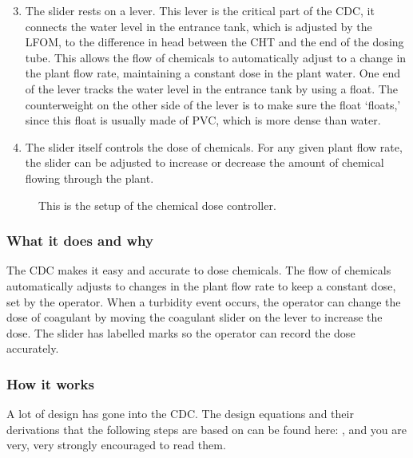 \documentclass[letterpaper,10pt,english]{sphinxmanual}
\let\sphinxpxdimen\pdfpxdimen\else\newdimen\sphinxpxdimen
\begin{document}
\begin{enumerate}
\setcounter{enumi}{2}
\item {} 
The slider rests on a lever. This lever is the critical part of the CDC, it connects the water level in the entrance tank, which is adjusted by the LFOM, to the difference in head between the CHT and the end of the dosing tube. This allows the flow of chemicals to automatically adjust to a change in the plant flow rate, maintaining a constant dose in the plant water. One end of the lever tracks the water level in the entrance tank by using a float. The counterweight on the other side of the lever is to make sure the float ‘floats,’ since this float is usually made of PVC, which is more dense than water.

\item {} 
The slider itself controls the dose of chemicals. For any given plant flow rate, the slider can be adjusted to increase or decrease the amount of chemical flowing through the plant.

\end{enumerate}

\begin{figure}[htbp]
\centering
\capstart

\noindent\sphinxincludegraphics[width=600\sphinxpxdimen]{{cdc_labelled}.png}
\caption{This is the setup of the chemical dose controller.}\label{\detokenize{Flow_Control_and_Measurement/FCM_Design:id10}}\label{\detokenize{Flow_Control_and_Measurement/FCM_Design:figure-cdc-labelled}}\end{figure}


\subsubsection{What it does and why}
\label{\detokenize{Flow_Control_and_Measurement/FCM_Design:id6}}
The CDC makes it easy and accurate to dose chemicals. The flow of chemicals automatically adjusts to changes in the plant flow rate to keep a constant dose, set by the operator. When a turbidity event occurs, the operator can change the dose of coagulant by moving the coagulant slider  on the lever to increase the dose. The slider has labelled marks so the operator can record the dose accurately.


\subsubsection{How it works}
\label{\detokenize{Flow_Control_and_Measurement/FCM_Design:id7}}
A lot of design has gone into the CDC. The design equations and their derivations that the following steps are based on can be found here: {\hyperref[\detokenize{Flow_Control_and_Measurement/FCM_Derivations:heading-design-equations-for-the-cdc}]{}}, and you are very, very strongly encouraged to read them.
\end{document}
